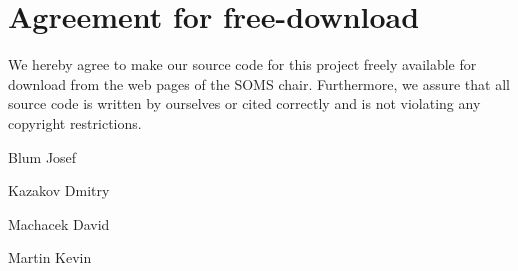 \documentclass[11pt]{article}
\begin{document}

\newpage


\newpage
\section*{Agreement for free-download}
\bigskip


\bigskip


\large We hereby agree to make our source code for this project freely available for download from the web pages of the SOMS chair. Furthermore, we assure that all source code is written by ourselves or cited correctly and is not violating any copyright restrictions.


\bigskip


\bigskip




\begin{minipage}{4cm}
\vspace{2mm} \large Blum Josef

 \vspace{\baselineskip}

\end{minipage}
\begin{minipage}{4cm}
	\vspace{2mm} \large Kazakov Dmitry
	
	\vspace{\baselineskip}
	
\end{minipage}
\begin{minipage}{4cm}
	\vspace{2mm} \large Machacek David
	
	\vspace{\baselineskip}
	
\end{minipage}
\begin{minipage}{4cm}

\vspace{2mm} \large Martin Kevin

\vspace{\baselineskip}
\end{minipage}
\end{document}
